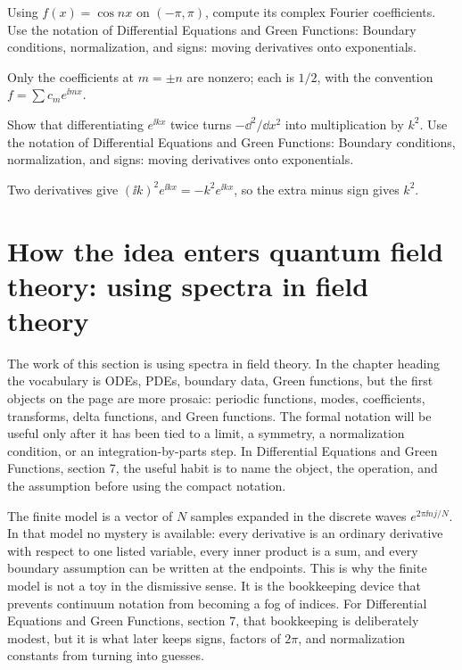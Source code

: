 \begin{exercise}
Using \(f(x)=\cos nx\) on \((-\pi,\pi)\), compute its complex Fourier coefficients.  Use the notation of Differential Equations and Green Functions: Boundary conditions, normalization, and signs: moving derivatives onto exponentials.
\begin{answer}
Only the coefficients at \(m=\pm n\) are nonzero; each is \(1/2\), with the convention \(f=\sum c_me^{\ii mx}\).
\end{answer}
\end{exercise}

\begin{exercise}
Show that differentiating \(e^{\ii kx}\) twice turns \(-\dd^2/\dd x^2\) into multiplication by \(k^2\).  Use the notation of Differential Equations and Green Functions: Boundary conditions, normalization, and signs: moving derivatives onto exponentials.
\begin{answer}
Two derivatives give \((\ii k)^2e^{\ii kx}=-k^2e^{\ii kx}\), so the extra minus sign gives \(k^2\).
\end{answer}
\end{exercise}



\section{How the idea enters quantum field theory: using spectra in field theory}

The work of this section is using spectra in field theory.  In the chapter heading the vocabulary is ODEs, PDEs, boundary data, Green functions, but the first objects on the page are more prosaic: periodic functions, modes, coefficients, transforms, delta functions, and Green functions.  The formal notation will be useful only after it has been tied to a limit, a symmetry, a normalization condition, or an integration-by-parts step.  In Differential Equations and Green Functions, section 7, the useful habit is to name the object, the operation, and the assumption before using the compact notation.

The finite model is a vector of \(N\) samples expanded in the discrete waves \(e^{2\pi \ii nj/N}\).  In that model no mystery is available: every derivative is an ordinary derivative with respect to one listed variable, every inner product is a sum, and every boundary assumption can be written at the endpoints.  This is why the finite model is not a toy in the dismissive sense.  It is the bookkeeping device that prevents continuum notation from becoming a fog of indices.  For Differential Equations and Green Functions, section 7, that bookkeeping is deliberately modest, but it is what later keeps signs, factors of \(2\pi\), and normalization constants from turning into guesses.

